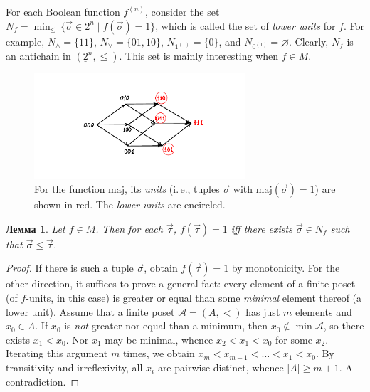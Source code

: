 \documentclass[12pt,notitlepage]{article}
\theoremstyle{plain}
\newtheorem{lemma}[thm]{Лемма}
\theoremstyle{definition}
\theoremstyle{plain}
\newcommand{\void}{\varnothing}
\newcommand{\ul}[1]{\underline{#1}}
\newcommand{\1}{\mathbf{1}}
\newcommand{\0}{\mathbf{0}}
\begin{document}
For each Boolean function $f^{(n)}$, consider the set $N_f = \min_{\leq}\, \{ \vec{\sigma} \in \ul{2}^n \mid f(\vec{\sigma}) = 1 \}$, which is called the set of \emph{lower units} for $f$. For example, $N_{\wedge} = \{11\}$, $N_{\vee} =\{01, 10\}$, $N_{1^{(1)}} = \{0\}$, and $N_{0^{(1)}} = \void$. Clearly, $N_f$ is an antichain in $(\ul{2}^n, {\leq})$. This set is mainly interesting when $f \in M$.

\begin{figure}[h]
	\centering
	\includegraphics*[width=0.7\textwidth]{lower_units.pdf}
	\caption{For the function $\mathrm{maj}$, its \emph{units} (i.\,e., tuples $\vec{\sigma}$ with $\mathrm{maj}(\vec \sigma) = 1$) are shown in red. The \emph{lower units} are encircled.}
\end{figure}

\begin{lemma}\label{bool:mono_units}
	Let $f \in M$. Then for each $\vec \tau$, $f(\vec \tau) = 1$ iff there exists $\vec{\sigma} \in N_f$ such that $\vec\sigma \leq \vec \tau$.
\end{lemma}
\begin{proof}
	If there is such a tuple $\vec{\sigma}$, obtain $f(\vec \tau) = 1$ by monotonicity. For the other direction, it suffices to prove a general fact: every element of a finite poset (of $f$-units, in this case) is greater or equal than some \emph{minimal} element thereof (a lower unit). Assume that a finite poset $\mathcal A = (A, <)$ has just $m$ elements and $x_0 \in A$. If $x_0$ is \emph{not} greater nor equal than a minimum, then $x_0 \notin \min \mathcal A$, so there exists $x_1 < x_0$. Nor $x_1$ may be minimal, whence $x_2 < x_1 < x_0$ for some $x_2$. Iterating this argument $m$ times, we obtain $x_m < x_{m-1} < \ldots < x_1 < x_0$. By transitivity and irreflexivity, all $x_i$ are pairwise distinct, whence $|A| \geq m + 1$. A contradiction.
\end{proof}
\end{document}
